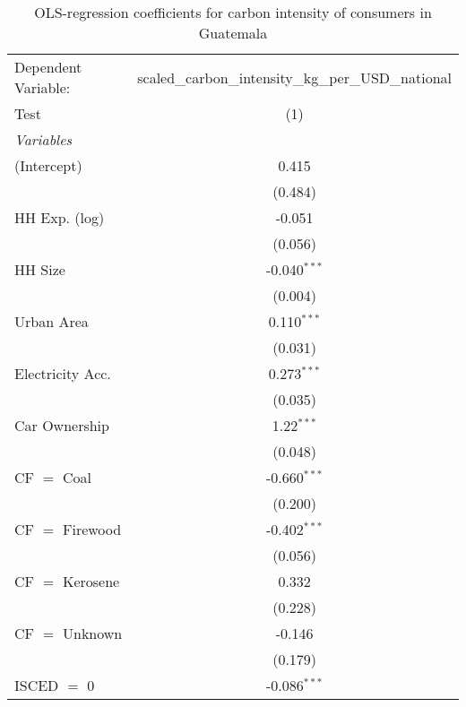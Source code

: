 
\begin{table}[htbp!]
   \centering
   \small
   \begin{adjustbox}{width = 1\textwidth, max height = 0.95\textheight, center}
      \begin{threeparttable}[b]
         \caption{\label{tab:OLS_1_GTM} OLS-regression coefficients for carbon intensity of consumers in Guatemala}
         \begin{tabular}{lc}
            \tabularnewline \midrule \midrule
            Dependent Variable: & scaled\_carbon\_intensity\_kg\_per\_USD\_national\\        
            Test                & (1)\\  
            \midrule
            \emph{Variables}\\
            (Intercept)         & 0.415\\   
                                & (0.484)\\   
            HH Exp. (log)       & -0.051\\   
                                & (0.056)\\   
            HH Size             & -0.040$^{***}$\\   
                                & (0.004)\\   
            Urban Area          & 0.110$^{***}$\\   
                                & (0.031)\\   
            Electricity Acc.    & 0.273$^{***}$\\   
                                & (0.035)\\   
            Car Ownership       & 1.22$^{***}$\\   
                                & (0.048)\\   
            CF $=$ Coal         & -0.660$^{***}$\\   
                                & (0.200)\\   
            CF $=$ Firewood     & -0.402$^{***}$\\   
                                & (0.056)\\   
            CF $=$ Kerosene     & 0.332\\   
                                & (0.228)\\   
            CF $=$ Unknown      & -0.146\\   
                                & (0.179)\\   
            ISCED $=$ 0         & -0.086$^{***}$\\   

\end{tabular}
\end{threeparttable}
\end{adjustbox}
\end{table}
